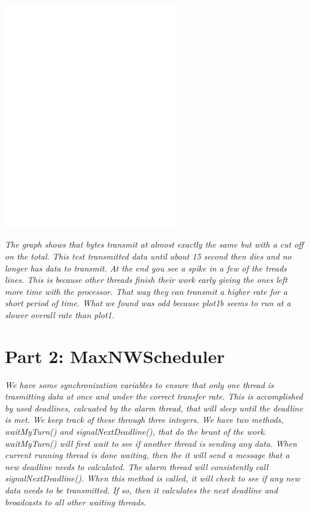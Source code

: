 \documentclass[11pt, letterpaper]{article}
\begin{document}
\centerline{\includegraphics[width=3in]{plot1b}}

{\em The graph shows that bytes transmit at almost exactly the same but with a cut off on the total. This test transmitted data until about 15 second then dies and no longer has data to transmit. At the end you see a spike in a few of the treads lines. This is because other threads finish their work early giving the ones left more time with the processor. That way they can transmit a higher rate for a short period of time. What we found was odd because plot1b seems to run at a slower overall rate than plot1. }



\section{Part 2: MaxNWScheduler}

{\em We have some synchronization variables to ensure that only one thread is trasmitting data at once and under the correct transfer rate. This is accomplished by used deadlines, calcuated by the alarm thread, that will sleep until the deadline is met. We keep track of these through three integers. We have two methods, waitMyTurn() and signalNextDeadline(), that do the brunt of the work. waitMyTurn() will first wait to see if another thread is sending any data. When current running thread is done waiting, then the it will send a message that a new deadline needs to calculated. The alarm thread will consistently call signalNextDeadline(). When this method is called, it will check to see if any new data needs to be transmitted. If so, then it calculates the next deadline and broadcasts to all other waiting threads.}
\end{document}
